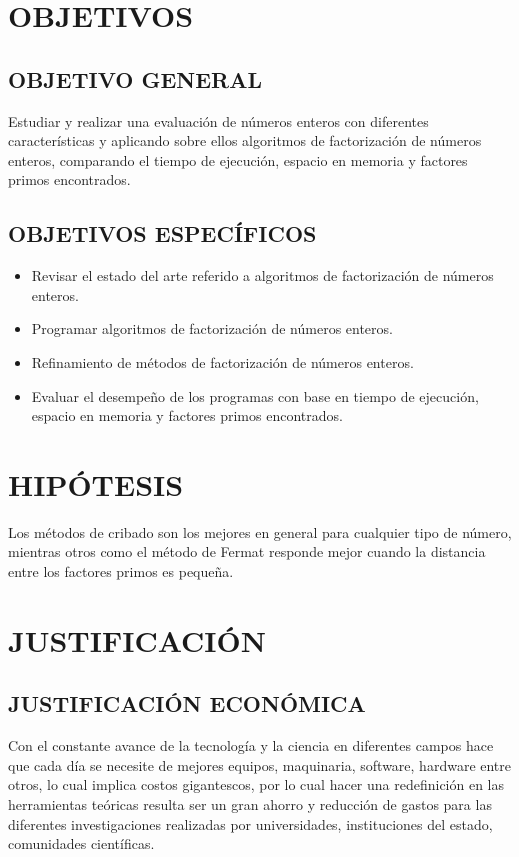 \documentclass[12pt,letterpaper]{book}
\begin{document}
    \chapter{OBJETIVOS}
    \section{OBJETIVO GENERAL}
    Estudiar y realizar una evaluación de números enteros con diferentes características y aplicando sobre ellos algoritmos de factorización de números enteros, comparando el tiempo de ejecución, espacio en memoria y factores primos encontrados.

    \section{OBJETIVOS ESPECÍFICOS}
    \begin{itemize}
        \item{Revisar el estado del arte referido a algoritmos de factorización de números enteros.}
        \item{Programar algoritmos de factorización de números enteros.}
        \item{Refinamiento de métodos de factorización de números enteros.}
        \item{Evaluar el desempeño de los programas con base en tiempo de ejecución, espacio en memoria y factores primos encontrados.}
    \end{itemize}
    
    \chapter{HIPÓTESIS}
    Los métodos de cribado son los mejores en general para cualquier tipo de número, mientras otros como el método de Fermat responde mejor cuando la distancia entre los factores primos es pequeña.
    
    \chapter{JUSTIFICACIÓN}
    \section{JUSTIFICACIÓN ECONÓMICA}
    Con el constante avance de la tecnología y la ciencia en diferentes campos hace que cada día se necesite de mejores equipos, maquinaria, software, hardware entre otros, lo cual implica costos gigantescos, por lo cual hacer una redefinición en las herramientas teóricas resulta ser un gran ahorro y reducción de gastos para las diferentes investigaciones realizadas por universidades, instituciones del estado, comunidades científicas.
\end{document}
